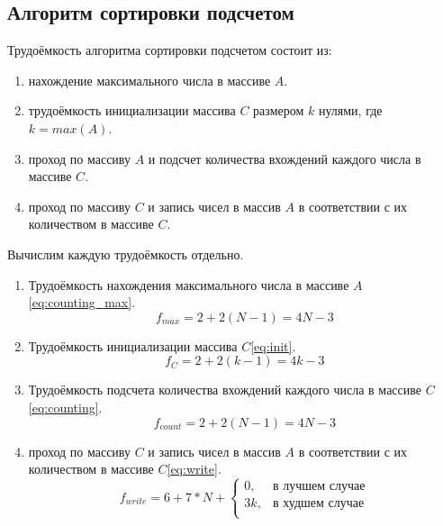 \subsection{Алгоритм сортировки подсчетом}

Трудоёмкость алгоритма сортировки подсчетом состоит из:
\begin{enumerate}
    \item нахождение максимального числа в массиве $A$.
    \item трудоёмкость инициализации массива $C$ размером $k$ нулями, где $k = max(A)$.
    \item проход по массиву $A$ и подсчет количества вхождений каждого числа в массиве $C$.
    \item проход по массиву $C$ и запись чисел в массив $A$ в соответствии с их количеством в массиве $C$.
\end{enumerate}

Вычислим каждую трудоёмкость отдельно.

\begin{enumerate}
    \item Трудоёмкость нахождения максимального числа в массиве $A$\eqref{eq:counting_max}.
    \begin{equation}
        \label{eq:counting_max}
        f_{max} = 2 + 2(N - 1) = 4N - 3
    \end{equation}
    \item Трудоёмкость инициализации массива $C$\eqref{eq:init}.
    \begin{equation}
        \label{eq:init}
        f_{C} = 2 + 2(k - 1) = 4k - 3
    \end{equation}
    \item Трудоёмкость подсчета количества вхождений каждого числа в массиве $C$\eqref{eq:counting}.
    \begin{equation}
        \label{eq:counting}
        f_{count} = 2 + 2(N - 1) = 4N - 3
    \end{equation}
    \item проход по массиву $C$ и запись чисел в массив $A$ в соответствии с их количеством в массиве $C$\eqref{eq:write}.
    \begin{equation}
        \label{eq:write}
        f_{write} = 6 + 7 * N + \begin{cases}
                            0, & \text{в лучшем случае}\\
                            3k, & \text{в худшем случае}\\
        \end{cases}
    \end{equation}
\end{enumerate}

